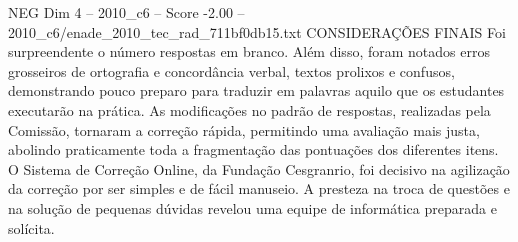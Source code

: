 \begin{textsample}{NEG Dim 4 – 2010\_c6 – Score -2.00 – 2010\_c6/enade\_2010\_tec\_rad\_711bf0db15.txt}
CONSIDERAÇÕES FINAIS Foi surpreendente o número respostas em branco.
Além disso, foram notados erros grosseiros de ortografia e concordância verbal, textos prolixos e confusos, demonstrando pouco preparo para traduzir em palavras aquilo que os estudantes executarão na prática.
As modificações no padrão de respostas, realizadas pela Comissão, tornaram a correção rápida, permitindo uma avaliação mais justa, abolindo praticamente toda a fragmentação das pontuações dos diferentes itens.
O Sistema de Correção Online, da Fundação Cesgranrio, foi decisivo na agilização da correção por ser simples e de fácil manuseio.
A presteza na troca de questões e na solução de pequenas dúvidas revelou uma equipe de informática preparada e solícita.

\end{textsample}
